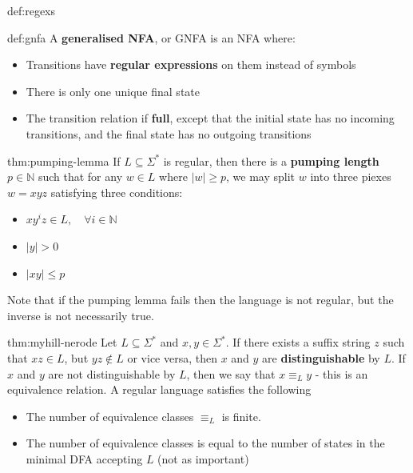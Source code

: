 \documentclass[landscape, 8pt]{extarticle}
\begin{document}
\begin{multicols}{3}
\begin{dfn}{def:regexs}{}
\end{dfn}


\begin{dfn}{def:gnfa}{}
A \textbf{generalised NFA}, or GNFA is an NFA where:
\renewcommand\labelitemi{\tiny$\bullet$}
\begin{itemize}
    \setlength\itemsep{0em}
    \item Transitions have \textbf{regular expressions} on them instead of symbols
    \item There is only one unique final state
    \item The transition relation if \textbf{full}, except that the initial state has no incoming transitions, and the final state has no outgoing transitions
\end{itemize}
\end{dfn}


\begin{thm}{thm:pumping-lemma}{}
If $L\subseteq \Sigma^{*}$ is regular, then there is a \textbf{pumping length} $p\in\mathbb{N}$ such that for any $w\in L$ where $\lvert w\rvert \ge p$, we may split $w$ into three piexes $w=xyz$ satisfying three conditions:
\renewcommand\labelitemi{\tiny$\bullet$}
\begin{itemize}
    \setlength\itemsep{0em}
    \item $xy^{i}z\in L,\quad \forall i\in \mathbb{N}$
    \item $\lvert y\rvert > 0$
    \item $\lvert xy\rvert \le p$
\end{itemize}
Note that if the pumping lemma fails then the language is not regular, but the inverse is not necessarily true.
\end{thm}

\begin{thm}{thm:myhill-nerode}{}
Let $L\subseteq \Sigma^{*}$ and $x,y\in \Sigma^{*}$. If there exists a suffix string $z$ such that $xz\in L$, but $yz \not\in L$ or vice versa, then $x$ and $y$ are \textbf{distinguishable} by $L$.
If $x$ and $y$ are not distinguishable by $L$, then we say that $x \equiv_{L} y$ - this is an equivalence relation. A regular language satisfies the following
\renewcommand\labelitemi{\tiny$\bullet$}
\begin{itemize}
    \setlength\itemsep{0em}
    \item The number of equivalence classes $\equiv_{L}$ is finite.
    \item The number of equivalence classes is equal to the number of states in the minimal DFA accepting $L$ (not as important)
\end{itemize}


\end{thm}
\end{multicols}
\end{document}

